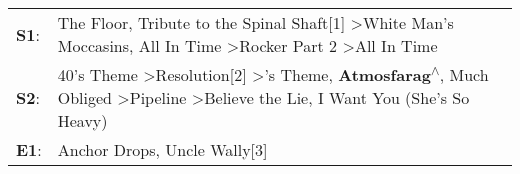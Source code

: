 \begin{supertabular}{p{0.03\textwidth}p{0.92\textwidth}}
 \textbf{S1}:  &                                                                                                   The Floor\textsuperscript{}, \enspace Tribute to the Spinal Shaft[1]\textsuperscript{} \textgreater \enspace White Man's Moccasins\textsuperscript{}, \enspace All In Time\textsuperscript{} \textgreater \enspace Rocker Part 2\textsuperscript{} \textgreater \enspace All In Time\textsuperscript{}  \enspace  \\
 \textbf{S2}:  &  40's Theme\textsuperscript{} \textgreater \enspace Resolution[2]\textsuperscript{} \textgreater {}'s Theme\textsuperscript{}, \enspace \textbf{Atmosfarag\textsuperscript{$\wedge$}}, \enspace Much Obliged\textsuperscript{} \textgreater \enspace Pipeline\textsuperscript{} \textgreater \enspace Believe the Lie\textsuperscript{}, \enspace I Want You (She's So Heavy)\textsuperscript{}  \enspace  \\
 \textbf{E1}:  &                                                                                                                                                                                                                                                                                                                                Anchor Drops\textsuperscript{}, \enspace Uncle Wally[3]\textsuperscript{}  \enspace  \\
\end{supertabular}
